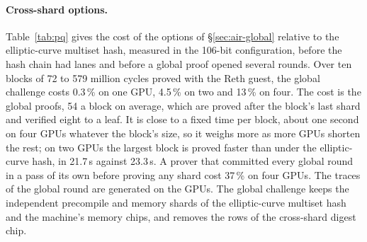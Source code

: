 \paragraph{Cross-shard options.}\label{sec:perf-global} Table~\ref{tab:pq} gives the cost of the options of \S\ref{sec:air-global} relative to the elliptic-curve multiset hash, measured in the 106-bit configuration, before the hash chain had lanes and before a global proof opened several rounds. Over ten blocks of 72 to 579 million cycles proved with the Reth guest, the global challenge costs 0.3\,\% on one GPU, 4.5\,\% on two and 13\,\% on four. The cost is the global proofs, 54 a block on average, which are proved after the block's last shard and verified eight to a leaf. It is close to a fixed time per block, about one second on four GPUs whatever the block's size, so it weighs more as more GPUs shorten the rest; on two GPUs the largest block is proved faster than under the elliptic-curve hash, in 21.7\,s against 23.3\,s. A prover that committed every global round in a pass of its own before proving any shard cost 37\,\% on four GPUs. The traces of the global round are generated on the GPUs. The global challenge keeps the independent precompile and memory shards of the elliptic-curve multiset hash and the machine's memory chips, and removes the rows of the cross-shard digest chip.

